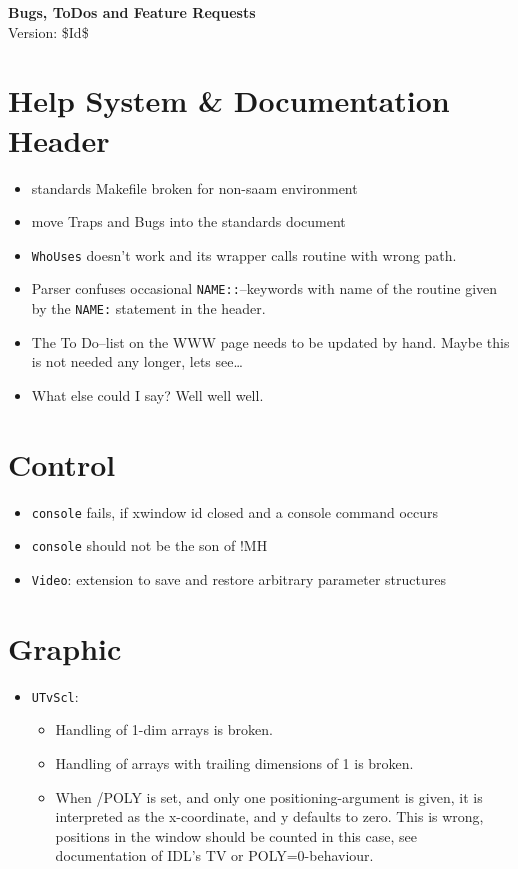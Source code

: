 \documentclass[12pt]{article}
\begin{document}
\begin{center}
{\Huge\textbf{Bugs, ToDos and Feature Requests}}\\[2cm]
Version: \$Id$ $\$ 
\end{center}

\section{Help System \& Documentation Header} 

\begin{itemize}
\item standards Makefile broken for non-saam environment
\item move Traps and Bugs into the standards document
\item \texttt{WhoUses} doesn't work and its wrapper calls routine with wrong path.
\item Parser confuses occasional \texttt{NAME::}--keywords with name
  of the routine given by the \texttt{NAME:} statement in the header.
\item The To Do--list on the WWW page needs to be updated by
  hand. Maybe this is not needed any longer, lets see\ldots
\item What else could I say? Well well well.
\end{itemize}



\section{Control}
\begin{itemize}
\item \texttt{console} fails, if xwindow id closed and a console command occurs
\item \texttt{console} should not be the son of !MH
\item \texttt{Video}: extension to save and restore arbitrary parameter structures
\end{itemize}


\section{Graphic}
\begin{itemize}
\item \texttt{UTvScl}:
\begin{itemize}
  \item Handling of 1-dim arrays is broken.
  \item Handling of arrays with trailing dimensions of 1 is broken.
  \item When /POLY is set, and only one positioning-argument is given,
    it is interpreted as the x-coordinate, and y defaults to zero.
    This is wrong, positions in the window should be counted in this
    case, see documentation of IDL's TV or POLY=0-behaviour.
\end{itemize}
\end{itemize}
\end{document}
